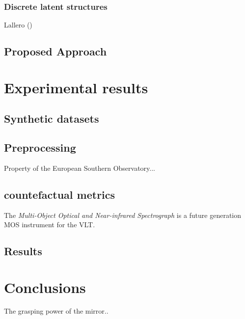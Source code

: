 \documentclass[binding=0.6cm]{sapthesis}
\newcommand{\mycite}[1]{(\cite{#1})}
\begin{document}
\subsection{Discrete latent structures}
\label{sec:cfpg.bg.discrete-latent}
Lallero \mycite{niculae2023discrete}

\section{Proposed Approach}
\label{sec:cfpg.bg.my-archs}





\chapter{Experimental results}
\label{chap:4-expRes}

\section{Synthetic datasets}
\label{sec:expRes.syns-dataset}

\section{Preprocessing}
\label{sec:expRes.preprocessing}
Property of the European Southern Observatory...

\section{countefactual metrics}
\label{sec:expRes.cf-metrics}
The \textit{Multi-Object Optical and Near-infrared Spectrograph} is a future generation MOS instrument for the VLT. 

\section{Results}
\label{sec:expRes-res}




\chapter{Conclusions}
\label{chap:5-conclusions} 
The grasping power of the mirror..





\backmatter
\cleardoublepage %

\printbibheading
\printbibliography[type=article,heading=subbibliography,title={Articles}]
\printbibliography[type=inbook,heading=subbibliography,title={Inproceedings}]
\printbibliography[type=book,heading=subbibliography,title={Books}]
\printbibliography[type=misc,heading=subbibliography,title={Miscellaneous}]
\end{document}
